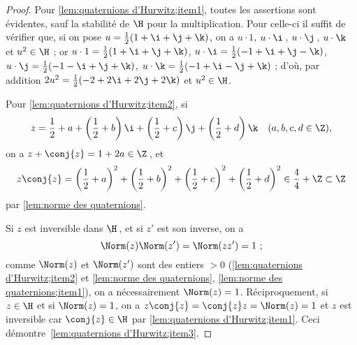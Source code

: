 \documentclass[11pt, useosf,
  title in boldface,
  theorem in new line,
  theorem numbering = section,
  number theorems separately,
]{simplivre}
\begin{document}
    \begin{proof}
        Pour \ref{lem:quaternions d'Hurwitz;item1}, toutes les assertions sont évidentes, sauf la stabilité de \( \H \) pour la multiplication. Pour celle-ci il suffit de vérifier que, si on pose \( u = \frac{1}{2}(1+\i+\j+\k) \), on a \( u \cdot 1 \), \( u \cdot \i \)\,, \( u \cdot \j \)\,, \( u \cdot \k \) et \( u^2 \in \H \) ; or \( u \cdot 1 = \frac{1}{2}(1+\i+\j+\k) \), \( u \cdot \i = \frac{1}{2}(-1+\i+\j-\k) \), \( u \cdot \j = \frac{1}{2}(-1-\i+\j+\k) \), \( u \cdot \k = \frac{1}{2}(-1+\i-\j+\k) \) ; d'où, par addition \( 2u^2 = \frac{1}{2}(-2+2\i+2\j+2\k) \) et \( u^2 \in \H \).

        Pour \ref{lem:quaternions d'Hurwitz;item2}, si
        \[
            z = \frac{1}{2}+a + \left(\frac{1}{2}+b\right) \i + \left(\frac{1}{2}+c\right) \j + \left(\frac{1}{2}+d\right) \k \quad \text{(\( a,b,c,d \in \Z \))},
        \]
        on a \( z + \conj{z} = 1 + 2a \in \Z \)\,, et
        \[
            z \conj{z} = \left(\frac{1}{2}+a\right)^2 + \left(\frac{1}{2}+b\right)^2 + \left(\frac{1}{2}+c\right)^2 + \left(\frac{1}{2}+d\right)^2 \in \frac{4}{4} + \Z \subset \Z
        \]
        par \cref{lem:norme des quaternions}.

        Si \( z \) est inversible dans \( \H \)\,, et si \( z' \) est son inverse, on a
        \[
            \Norm(z)\Norm(z') = \Norm(z z') = 1 ~;
        \]
        comme \( \Norm(z) \) et \( \Norm(z') \) sont des entiers \( > 0 \) (\ref{lem:quaternions d'Hurwitz;item2} et \cref{lem:norme des quaternions}, \ref{lem:norme des quaternions;item1}), on a nécessairement \( \Norm(z) = 1 \). Réciproquement, si \( z \in \H \) et si \( \Norm(z) = 1 \), on a \( z \conj{z} = \conj{z} z = \Norm(z) = 1 \) et \( z \) est inversible car \( \conj{z} \in \H \) par \ref{lem:quaternions d'Hurwitz;item1}. Ceci démontre~\ref{lem:quaternions d'Hurwitz;item3}.


\end{proof}
\end{document}

